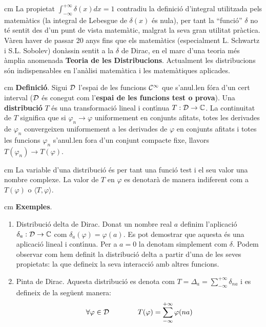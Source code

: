 \documentclass{article}
\def\C{\mathbb C}
\begin{document}
 cm 
La propietat $\int_{-\infty}^{+\infty} \delta(x) dx = 1$
 contradiu la definici\'o d'integral utilitzada
pels matem\`atics (la integral de Lebesgue de $\delta(x)$ \'es nula), per 
tant la ``funci\'o'' $\delta$ no t\'e sentit des d'un punt de vista
matem\`atic, malgrat la seva gran utilitat pr\`actica. 
V\`aren haver de passar 20 anys fins que els matem\`atics (especialment 
L. Schwartz i S.L. Sobolev) don\`assin sentit a la $\delta$ de Dirac, en 
el marc d'una teoria m\'es \`amplia anomenada 
{\bf Teoria de les Distribucions}.   
Actualment les distribucions s\'on indispensables en l'an\`alisi 
matem\`atica i les matem\`atiques aplicades. 

 cm
\textbf{Definici\'o}. Sigui ${\cal D}$ l'espai de les funcions 
${\cal C}^\infty$ que s'anul.len f\'ora d'un cert interval (${\cal D}$ \'es
conegut com l'{\bf espai de les funcions test o prova}). 
Una {\bf distribuci\'o} $T$ \'es una transformaci\'o lineal i cont\'\i nua 
$T:{\cal D} \rightarrow \C$.
La continuitat de $T$ significa que si $\varphi_n \rightarrow \varphi$ uniformement
en conjunts afitats, totes les derivades de $\varphi_n$ convergeixen 
uniformement a les derivades de $\varphi$ en conjunts afitats i totes les 
funcions $\varphi_n$ s'anul.len fora d'un conjunt compacte fixe, llavors
$T(\varphi_n) \rightarrow T(\varphi)$.

 cm
La variable d'una distribuci\'o \'es per tant una funci\'o test i el seu 
valor una nombre complexe. La valor de $T$ en $\varphi$ es denotar\`a 
de manera indiferent com a $T(\varphi)$ o $\langle T, \varphi \rangle$.

 cm
\noindent
\textbf{Exemples}.
\begin{enumerate}[Exemple 1.]
\item Distribuci\'o delta de Dirac.
Donat un nombre real $a$ definim l'aplicaci\'o 
$\delta_a : {\cal D} \rightarrow \C$ com $\delta_a(\varphi)=\varphi(a)$.
Es pot demostrar que aquesta \'es una aplicaci\'o lineal i cont\'\i nua.
Per a $a=0$ la denotam simplement com $\delta$.
\newline
Podem observar com hem definit la distribuci\'o delta a partir d'una
de les seves propietats: la que defineix la seva interacci\'o amb altres 
funcions.
\item Pinta de Dirac. Aquesta distribuci\'o es denota com 
$T=\Delta_a=\sum_{-\infty}^{+\infty} \delta_{na}$
i es defineix de la seg\"uent manera: 
\[
\forall \varphi \in {\cal D} \qquad \qquad T(\varphi)=
\sum_{-\infty}^{+\infty} \varphi(na)
\] 
\end{enumerate}
\end{document}
